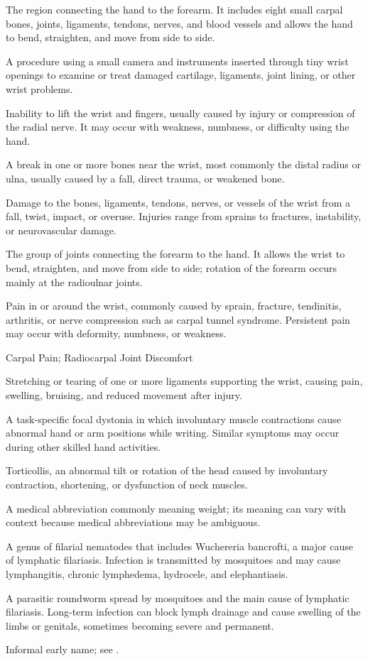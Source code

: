  The region connecting the hand to the forearm. It includes eight small carpal bones, joints, ligaments, tendons, nerves, and blood vessels and allows the hand to bend, straighten, and move from side to side.

 A procedure using a small camera and instruments inserted through tiny wrist openings to examine or treat damaged cartilage, ligaments, joint lining, or other wrist problems.

 Inability to lift the wrist and fingers, usually caused by injury or compression of the radial nerve. It may occur with weakness, numbness, or difficulty using the hand.

 A break in one or more bones near the wrist, most commonly the distal radius or ulna, usually caused by a fall, direct trauma, or weakened bone.

 Damage to the bones, ligaments, tendons, nerves, or vessels of the wrist from a fall, twist, impact, or overuse. Injuries range from sprains to fractures, instability, or neurovascular damage.

 The group of joints connecting the forearm to the hand. It allows the wrist to bend, straighten, and move from side to side; rotation of the forearm occurs mainly at the radioulnar joints.

 Pain in or around the wrist, commonly caused by sprain, fracture, tendinitis, arthritis,
or nerve compression such as carpal tunnel syndrome. Persistent pain may occur with deformity,
numbness, or weakness.

\synonyms
Carpal Pain; Radiocarpal Joint Discomfort

 Stretching or tearing of one or more ligaments supporting the wrist, causing pain, swelling, bruising, and reduced movement after injury.

 A task-specific focal dystonia in which involuntary muscle contractions cause abnormal hand or arm positions while writing. Similar symptoms may occur during other skilled hand activities.

 Torticollis, an abnormal tilt or rotation of the head caused by involuntary contraction, shortening, or dysfunction of neck muscles.

 A medical abbreviation commonly meaning weight; its meaning can vary with context because medical abbreviations may be ambiguous.

 A genus of filarial nematodes that includes Wuchereria bancrofti, a major cause of
lymphatic filariasis. Infection is transmitted by mosquitoes and may cause lymphangitis,
chronic lymphedema, hydrocele, and elephantiasis.

 A parasitic roundworm spread by mosquitoes and the main cause of lymphatic filariasis. Long-term infection can block lymph drainage and cause swelling of the limbs or genitals, sometimes becoming severe and permanent.

 Informal early name; see .
